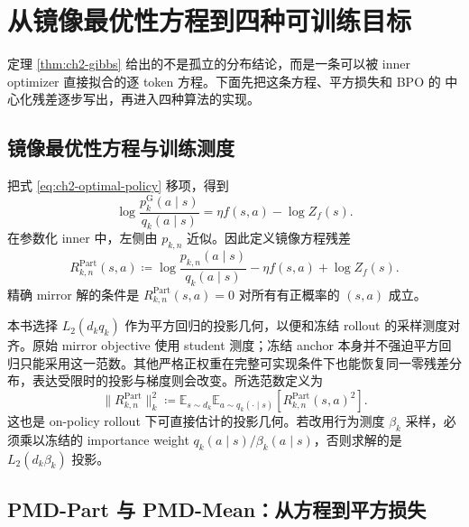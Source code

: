 \section{从镜像最优性方程到四种可训练目标}
\label{sec:ch2-objective-derivation}

定理 \ref{thm:ch2-gibbs} 给出的不是孤立的分布结论，而是一条可以被 inner
optimizer 直接拟合的逐 token 方程。下面先把这条方程、平方损失和 BPO 的
中心化残差逐步写出，再进入四种算法的实现。

\subsection{镜像最优性方程与训练测度}
\label{subsec:ch2-optimality-bridge}

把式 \eqref{eq:ch2-optimal-policy} 移项，得到
\begin{equation}
\label{eq:ch2-logratio-equation}
\log\frac{ p_k^{\mathrm G}(a\mid s)}{ q_k(a\mid s)}
=\eta f(s,a)-\log Z_f(s).
\end{equation}
在参数化 inner 中，左侧由 $ p_{k,n}$ 近似。因此定义镜像方程残差
\begin{equation}
R_{k,n}^{\mathrm{Part}}(s,a)
\coloneqq
\log\frac{ p_{k,n}(a\mid s)}{ q_k(a\mid s)}
-\eta f(s,a)+\log Z_f(s).
\label{eq:ch2-mirror-equation-residual}
\end{equation}
精确 mirror 解的条件是 $R_{k,n}^{\mathrm{Part}}(s,a)=0$ 对所有有正概率的
$(s,a)$ 成立。

本书选择 $L_2(d_kq_k)$ 作为平方回归的投影几何，以便和冻结 rollout 的采样测度对齐。原始 mirror objective 使用 student 测度；冻结 anchor 本身并不强迫平方回归只能采用这一范数。其他严格正权重在完整可实现条件下也能恢复同一零残差分布，表达受限时的投影与梯度则会改变。所选范数定义为
\begin{equation}
\lVert R_{k,n}^{\mathrm{Part}}\rVert_k^2
\coloneqq
\mathbb E_{s\sim d_k}\mathbb E_{a\sim q_k(\cdot\mid s)}
\left[R_{k,n}^{\mathrm{Part}}(s,a)^2\right].
\label{eq:ch2-anchor-projection-norm}
\end{equation}
这也是 on-policy rollout 下可直接估计的投影几何。若改用行为测度 $\beta_k$
采样，必须乘以冻结的 importance weight
$ q_k(a\mid s)/\beta_k(a\mid s)$，否则求解的是 $L_2(d_k\beta_k)$ 投影。

\subsection{PMD-Part 与 PMD-Mean：从方程到平方损失}
\label{subsec:ch2-pmd-loss-derivation}

